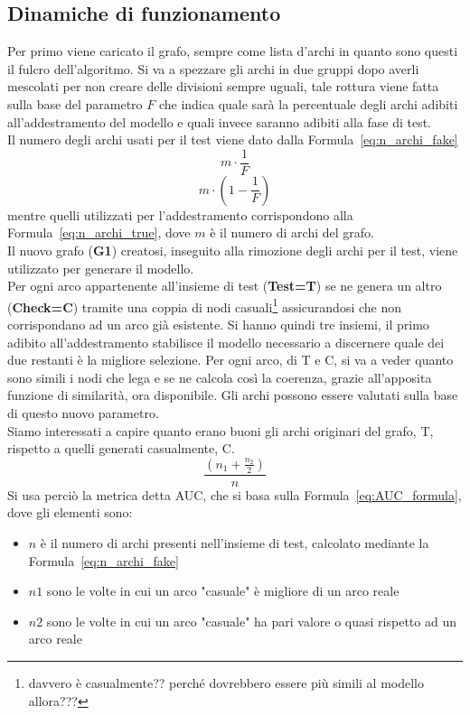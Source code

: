 \subsection{Dinamiche di funzionamento}
Per primo viene caricato il grafo, sempre come lista d'archi in quanto sono questi il fulcro dell'algoritmo. Si va a spezzare gli archi in due gruppi dopo averli mescolati per non creare delle divisioni sempre uguali, tale rottura viene fatta sulla base del parametro $F$ che indica quale sarà la percentuale degli archi adibiti all'addestramento del modello e quali invece saranno adibiti alla fase di test.\\
Il numero degli archi usati per il test viene dato dalla Formula~\ref{eq:n_archi_fake}
\begin{equation}
	m \cdot \frac{1}{F}
	\label{eq:n_archi_fake}
\end{equation} 
\begin{equation}
	m \cdot \left( 1- \frac{1}{F} \right)
	\label{eq:n_archi_true}
\end{equation}
mentre quelli utilizzati per l'addestramento corrispondono alla Formula~\ref{eq:n_archi_true}, dove $m$ è il numero di archi del grafo.\\
Il nuovo grafo (\textbf{G1}) creatosi, inseguito alla rimozione degli archi per il test, viene utilizzato per generare il modello.\\
Per ogni arco appartenente all'insieme di test (\textbf{Test=T}) se ne genera un altro (\textbf{Check=C}) tramite una coppia di nodi casuali\footnote{davvero è casualmente?? perché dovrebbero essere più simili al modello allora???} assicurandosi che non corrispondano ad un arco già esistente. Si hanno quindi tre insiemi, il primo adibito all'addestramento stabilisce il modello necessario a discernere quale dei due restanti è la migliore selezione.
Per ogni arco, di T e C, si va a veder quanto sono simili i nodi che lega e se ne calcola così la coerenza, grazie all'apposita funzione di similarità, ora disponibile. Gli archi possono essere valutati sulla base di questo nuovo parametro.\\
Siamo interessati a capire quanto erano buoni gli archi originari del grafo, T, rispetto a quelli generati casualmente, C. 
\begin{equation}
	\frac{\left( n_1 + \frac{n_2}{2} \right)}{n}
	\label{eq:AUC_formula}
\end{equation}
Si usa perciò la metrica detta AUC\cite{AUC_metric}, che si basa sulla Formula~\ref{eq:AUC_formula}, dove gli elementi sono:
\begin{itemize}
	\item $n$ è il numero di archi presenti nell'insieme di test, calcolato mediante la Formula~\ref{eq:n_archi_fake}
	\item $n1$ sono le volte in cui un arco "casuale" è migliore di un arco reale
	\item $n2$ sono le volte in cui un arco "casuale" ha pari valore o quasi rispetto ad un arco reale
\end{itemize}
